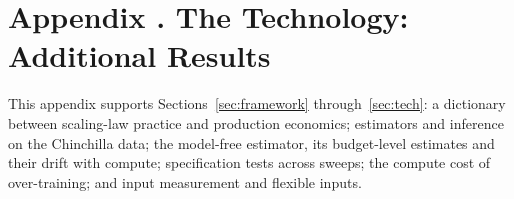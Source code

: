 
\section[The Technology: Additional Results]{Appendix \thesection. The Technology: Additional Results}\label{app:additional}
\setlength{\emergencystretch}{2em}%

This appendix supports Sections~\ref{sec:framework} through~\ref{sec:tech}: a dictionary between scaling-law practice and
production economics; estimators and inference on the Chinchilla data; the model-free estimator, its budget-level
estimates and their drift with compute; specification tests across sweeps; the compute cost of over-training; and input
measurement and flexible inputs.

